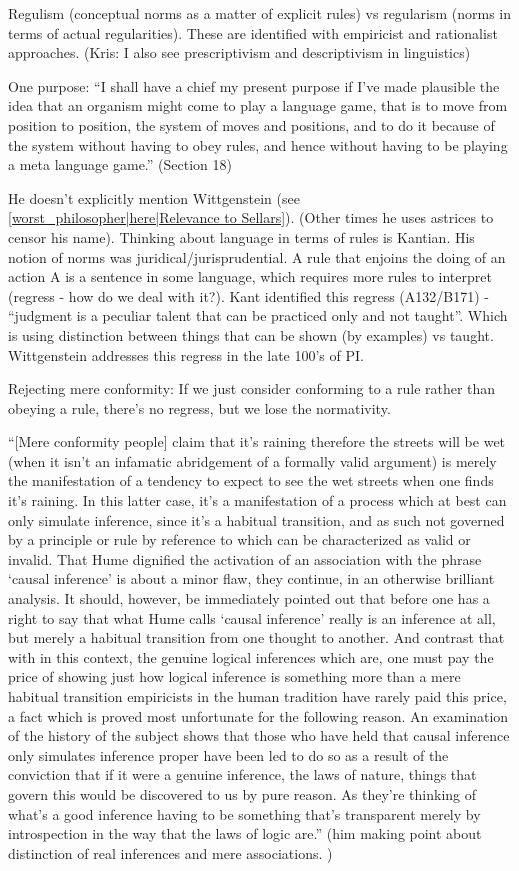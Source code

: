 Regulism (conceptual norms as a matter of explicit rules) vs regularism (norms in terms of actual regularities). These are identified with empiricist and rationalist approaches. (Kris: I also see prescriptivism and descriptivism in linguistics)

One purpose: ``I shall have a chief my present purpose if I've made plausible the idea that an organism might come to play a language game, that is to move from position to position, the system of moves and positions, and to do it because of the system without having to obey rules, and hence without having to be playing a meta language game.'' (Section 18)

He doesn't explicitly mention Wittgenstein (see \ref{worst_philosopher|here|Relevance to Sellars}). (Other times he uses astrices to censor his name). Thinking about language in terms of rules is Kantian. His notion of norms was juridical/jurisprudential. A rule that enjoins the doing of an action A is a sentence in some language, which requires more rules to interpret (regress - how do we deal with it?). Kant identified this regress (A132/B171) - ``judgment is a peculiar talent that can be practiced only and not taught''. Which is using distinction between things that can be shown (by examples) vs taught. Wittgenstein addresses this regress in the late 100's of PI.

Rejecting mere conformity: If we just consider conforming to a rule rather than obeying a rule, there's no regress, but we lose the normativity.

``[Mere conformity people] claim that it's raining therefore the streets will be wet (when it isn't an infamatic abridgement of a formally valid argument) is merely the manifestation of a tendency to expect to see the wet streets when one finds it's raining. In this latter case, it's a manifestation of a process which at best can only simulate inference, since it's a habitual transition, and as such not governed by a principle or rule by reference to which can be characterized as valid or invalid. That Hume dignified the activation of an association with the phrase `causal inference' is about a minor flaw, they continue, in an otherwise brilliant analysis. It should, however, be immediately pointed out that before one has a right to say that what Hume calls `causal inference' really is an inference at all, but merely a habitual transition from one thought to another. And contrast that with in this context, the genuine logical inferences which are, one must pay the price of showing just how logical inference is something more than a mere habitual transition empiricists in the human tradition have rarely paid this price, a fact which is proved most unfortunate for the following reason. An examination of the history of the subject shows that those who have held that causal inference only simulates inference proper have been led to do so as a result of the conviction that if it were a genuine inference, the laws of nature, things that govern this would be discovered to us by pure reason.  As they're thinking of what's a good inference having to be something that's transparent merely by introspection in the way that the laws of logic are.'' (him making point about distinction of real inferences and mere associations. )

